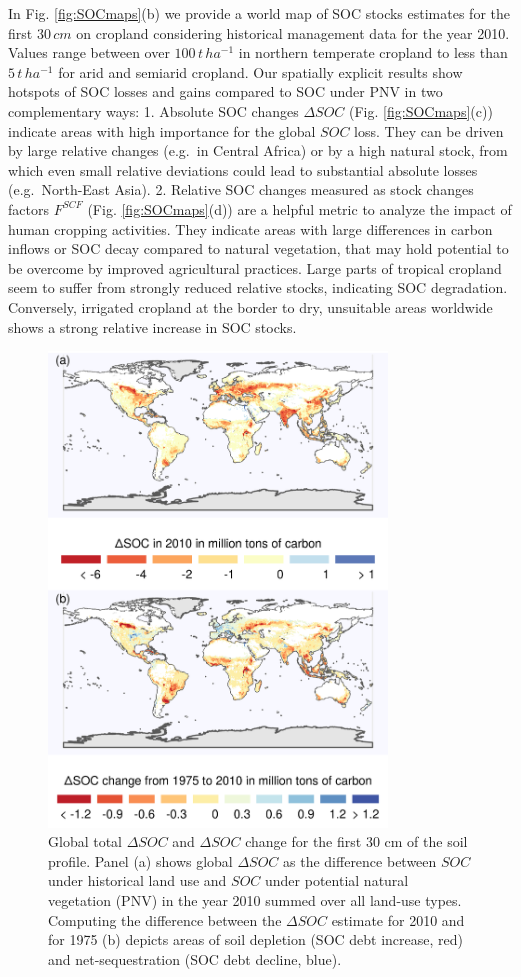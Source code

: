 \documentclass[gc, manuscript]{copernicus}
\begin{document}
In Fig. \ref{fig:SOCmaps}(b) we provide a world map of SOC stocks estimates for the first \(30\,\unit{cm}\) on cropland considering historical management data for the year 2010. Values range between over \(100\,\unit{t\,ha^{-1}}\) in northern temperate cropland to less than \(5\,\unit{t\,ha^{-1}}\) for arid and semiarid cropland.
Our spatially explicit results show hotspots of SOC losses and gains compared to SOC under PNV in two complementary ways:
1. Absolute SOC changes \(\Delta SOC\) (Fig. \ref{fig:SOCmaps}(c)) indicate areas with high importance for the global \(SOC\) loss. They can be driven by large relative changes (e.g.~in Central Africa) or by a high natural stock, from which even small relative deviations could lead to substantial absolute losses (e.g.~North-East Asia).
2. Relative SOC changes measured as stock changes factors \(F^{SCF}\) (Fig. \ref{fig:SOCmaps}(d)) are a helpful metric to analyze the impact of human cropping activities. They indicate areas with large differences in carbon inflows or SOC decay compared to natural vegetation, that may hold potential to be overcome by improved agricultural practices. Large parts of tropical cropland seem to suffer from strongly reduced relative stocks, indicating SOC degradation. Conversely, irrigated cropland at the border to dry, unsuitable areas worldwide shows a strong relative increase in SOC stocks.

\begin{figure}[h]
\includegraphics[width=9cm]{../ResultNotebooks/Output/Images/2panelfigure} \caption{Global total $\Delta SOC$ and $\Delta SOC$ change for the first 30 cm of the soil profile.
Panel (a) shows global $\Delta SOC$ as the difference between $SOC$ under historical land use and $SOC$ under potential natural vegetation (PNV) in the year 2010 summed over all land-use types. Computing the difference between the $\Delta SOC$ estimate for 2010 and for 1975 (b) depicts areas of soil depletion (SOC debt increase, red) and net-sequestration (SOC debt decline, blue).}\label{fig:SOCdebt}
\end{figure}
\end{document}
